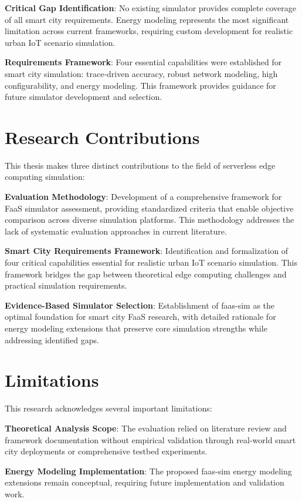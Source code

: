 \textbf{Critical Gap Identification}: No existing simulator provides complete coverage of all smart city requirements. Energy modeling represents the most significant limitation across current frameworks, requiring custom development for realistic urban IoT scenario simulation.

\textbf{Requirements Framework}: Four essential capabilities were established for smart city simulation: trace-driven accuracy, robust network modeling, high configurability, and energy modeling. This framework provides guidance for future simulator development and selection.

\section{Research Contributions}

This thesis makes three distinct contributions to the field of serverless edge computing simulation:

\textbf{Evaluation Methodology}: Development of a comprehensive framework for FaaS simulator assessment, providing standardized criteria that enable objective comparison across diverse simulation platforms. This methodology addresses the lack of systematic evaluation approaches in current literature.

\textbf{Smart City Requirements Framework}: Identification and formalization of four critical capabilities essential for realistic urban IoT scenario simulation. This framework bridges the gap between theoretical edge computing challenges and practical simulation requirements.

\textbf{Evidence-Based Simulator Selection}: Establishment of faas-sim as the optimal foundation for smart city FaaS research, with detailed rationale for energy modeling extensions that preserve core simulation strengths while addressing identified gaps.

\section{Limitations}

This research acknowledges several important limitations:

\textbf{Theoretical Analysis Scope}: The evaluation relied on literature review and framework documentation without empirical validation through real-world smart city deployments or comprehensive testbed experiments.

\textbf{Energy Modeling Implementation}: The proposed faas-sim energy modeling extensions remain conceptual, requiring future implementation and validation work.

